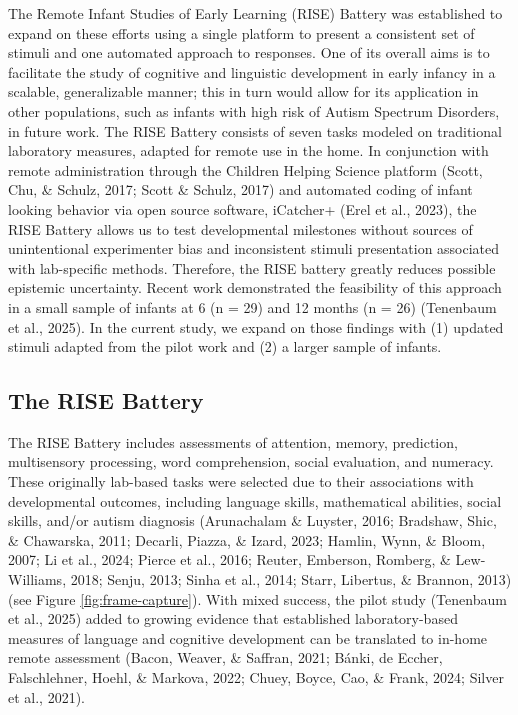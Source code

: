 \documentclass[
  english,
  man,floatsintext]{apa6}
\begin{document}
The Remote Infant Studies of Early Learning (RISE) Battery was established to expand on these efforts using a single platform to present a consistent set of stimuli and one automated approach to responses.
One of its overall aims is to facilitate the study of cognitive and linguistic development in early infancy in a scalable, generalizable manner; this in turn would allow for its application in other populations, such as infants with high risk of Autism Spectrum Disorders, in future work.
The RISE Battery consists of seven tasks modeled on traditional laboratory measures, adapted for remote use in the home.
In conjunction with remote administration through the Children Helping Science platform (Scott, Chu, \& Schulz, 2017; Scott \& Schulz, 2017) and automated coding of infant looking behavior via open source software, iCatcher+ (Erel et al., 2023), the RISE Battery allows us to test developmental milestones without sources of unintentional experimenter bias and inconsistent stimuli presentation associated with lab-specific methods.
Therefore, the RISE battery greatly reduces possible epistemic uncertainty.
Recent work demonstrated the feasibility of this approach in a small sample of infants at 6 (n = 29) and 12 months (n = 26) (Tenenbaum et al., 2025).
In the current study, we expand on those findings with (1) updated stimuli adapted from the pilot work and (2) a larger sample of infants.

\subsection{The RISE Battery}\label{the-rise-battery}

The RISE Battery includes assessments of attention, memory, prediction, multisensory processing, word comprehension, social evaluation, and numeracy.
These originally lab-based tasks were selected due to their associations with developmental outcomes, including language skills, mathematical abilities, social skills, and/or autism diagnosis (Arunachalam \& Luyster, 2016; Bradshaw, Shic, \& Chawarska, 2011; Decarli, Piazza, \& Izard, 2023; Hamlin, Wynn, \& Bloom, 2007; Li et al., 2024; Pierce et al., 2016; Reuter, Emberson, Romberg, \& Lew-Williams, 2018; Senju, 2013; Sinha et al., 2014; Starr, Libertus, \& Brannon, 2013) (see Figure \ref{fig:frame-capture}).
With mixed success, the pilot study (Tenenbaum et al., 2025) added to growing evidence that established laboratory-based measures of language and cognitive development can be translated to in-home remote assessment (Bacon, Weaver, \& Saffran, 2021; {Bánki, de Eccher, Falschlehner, Hoehl, \& Markova}, 2022; Chuey, Boyce, Cao, \& Frank, 2024; Silver et al., 2021).
\end{document}
